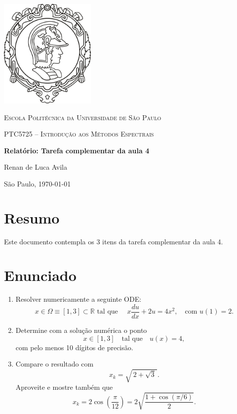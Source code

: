 \documentclass[11pt,a4paper]{article}
\begin{document}
\begin{titlepage}
    \centering
    \vspace*{0.5cm}
    \includegraphics[width=0.35\textwidth]{EP.jpg}\par\vspace{1cm}
    {\scshape\LARGE Escola Politécnica da Universidade de São Paulo \par}
    \vspace{1.2cm}
    {\scshape\Large PTC5725 -- Introdução aos Métodos Espectrais \par}
    \vspace{2.0cm}
    {\huge\bfseries Relatório: Tarefa complementar da aula 4\par}
    \vspace{2.0cm}
    {\Large Renan de Luca Avila\par}
    \vfill
    São Paulo, \today
\end{titlepage}

\tableofcontents
\clearpage

\section{Resumo}
Este documento contempla os 3 itens da tarefa complementar da aula 4.

\section{Enunciado}

\begin{enumerate}
    \item Resolver numericamente a seguinte ODE:
    \[
        x \in \Omega \equiv [1,3] \subset \mathbb{R} \text{ tal que } 
        \quad x\frac{du}{dx} + 2u = 4x^{2}, \quad \text{com } u(1)=2.
    \]
    \item Determine com a solução numérica o ponto 
    \[
        x \in [1,3] \quad \text{tal que} \quad u(x)=4,
    \]
    com pelo menos 10 dígitos de precisão.
    \item Compare o resultado com 
    \[
        x_k = \sqrt{\,2+\sqrt{3}\,}.
    \]
    Aproveite e mostre também que 
    \[
        x_k = 2\cos\!\left(\frac{\pi}{12}\right)
        = 2\sqrt{\frac{1+\cos(\pi/6)}{2}}.
    \]
\end{enumerate}
\end{document}
